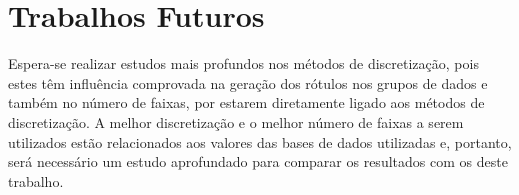 




\section{Trabalhos Futuros}\label{cap:fut}



Espera-se realizar estudos mais profundos nos métodos de discretização, pois estes têm influência comprovada na geração dos rótulos nos grupos de dados e também no número de faixas, por estarem diretamente ligado aos métodos de discretização. A melhor discretização e o melhor número de faixas a serem utilizados estão relacionados aos valores das bases de dados utilizadas e, portanto, será necessário um estudo aprofundado para comparar os resultados com os deste trabalho. 

